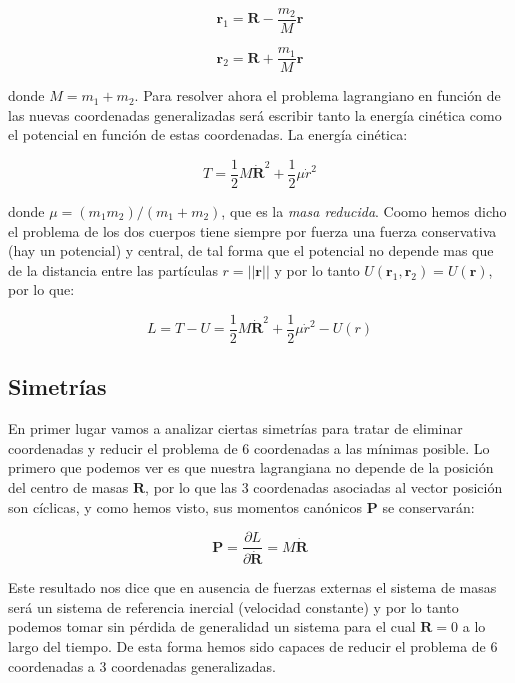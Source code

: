 \documentclass[12pt,a4paper]{book}
\newcommand{\parciales}[2]{\frac{\partial #1}{\partial #2}}
\newcommand{\rn}{\mathbf{r}}
\newcommand{\Rn}{\mathbf{R}}
\newcommand{\Pn}{\mathbf{P}}
\begin{document}
\begin{equation}
\rn_1 = \Rn - \dfrac{m_2}{M} \rn
\end{equation}

\begin{equation}
\rn_2 = \Rn + \dfrac{m_1}{M} \rn
\end{equation}


donde $M=m_1+m_2$. Para resolver ahora el problema lagrangiano en función de las nuevas coordenadas generalizadas será escribir tanto la energía cinética como el potencial en función de estas coordenadas. La energía cinética:

\begin{equation}
T = \frac{1}{2} M \dot{\Rn}^2 + \dfrac{1}{2} \mu \dot{r}^2
\end{equation}

donde $\mu = (m_1 m_2)/(m_1+m_2)$, que es la \textit{masa reducida}. Coomo hemos dicho el problema de los dos cuerpos tiene siempre por fuerza una fuerza conservativa (hay un potencial) y central, de tal forma que el potencial no depende mas que de la distancia entre las partículas $r = || \rn ||$ y por lo tanto $U(\rn_1,\rn_2) = U (\rn)$, por lo que:

\begin{equation}
L = T- U  =  \frac{1}{2} M \dot{\Rn}^2 + \dfrac{1}{2} \mu \dot{r}^2 - U(r)
\end{equation}

\subsection{Simetrías}

En primer lugar vamos a analizar ciertas simetrías para tratar de eliminar coordenadas y reducir el problema de 6 coordenadas a las mínimas posible. Lo primero que podemos ver es que nuestra lagrangiana no depende de la posición del centro de masas $\Rn$, por lo que las 3 coordenadas asociadas al vector posición son cíclicas, y como hemos visto, sus momentos canónicos $\Pn$ se conservarán:

\begin{equation}
\Pn  = \parciales{L}{\dot{\Rn}}  = M \dot{\Rn} 
\end{equation}

Este resultado nos dice que en ausencia de fuerzas externas el sistema de masas será un sistema de referencia inercial (velocidad constante) y por lo tanto podemos tomar sin pérdida de generalidad un sistema para el cual $\Rn = 0$ a lo largo del tiempo. De esta forma hemos sido capaces de reducir el problema de 6 coordenadas a 3 coordenadas generalizadas. 
\end{document}
